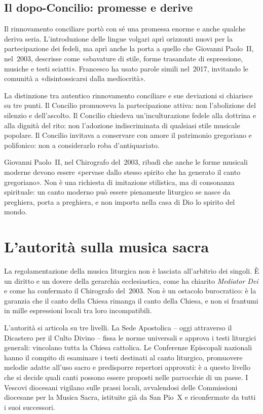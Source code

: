\documentclass[12pt,a4paper]{article}
\begin{document}
	\subsection{Il dopo-Concilio: promesse e derive}
	
	Il rinnovamento conciliare portò con sé una promessa enorme e anche qualche
	deriva seria. L'introduzione delle lingue volgari aprì orizzonti nuovi per la
	partecipazione dei fedeli, ma aprì anche la porta a quello che Giovanni
	Paolo~II, nel~2003, descrisse come «sbavature di stile, forme trasandate di
	espressione, musiche e testi sciatti». Francesco ha usato parole simili nel~2017,
	invitando le comunità a «disintossicarsi dalla mediocrità».
	
	La distinzione tra autentico rinnovamento conciliare e sue deviazioni si
	chiarisce su tre punti. Il Concilio promuoveva la partecipazione attiva: non
	l'abolizione del silenzio e dell'ascolto. Il Concilio chiedeva un'inculturazione
	fedele alla dottrina e alla dignità del rito: non l'adozione indiscriminata di
	qualsiasi stile musicale popolare. Il Concilio invitava a conservare con amore il
	patrimonio gregoriano e polifonico: non a considerarlo roba d'antiquariato.
	
	Giovanni Paolo~II, nel Chirografo del~2003, ribadì che anche le forme musicali
	moderne devono essere «pervase dallo stesso spirito che ha generato il canto
	gregoriano». Non è una richiesta di imitazione stilistica, ma di consonanza
	spirituale: un canto moderno può essere pienamente liturgico se nasce da
	preghiera, porta a preghiera, e non importa nella casa di Dio lo spirito del
	mondo.
	
	\section{L'autorità sulla musica sacra}
	
	La regolamentazione della musica liturgica non è lasciata all'arbitrio dei
	singoli. È un diritto e un dovere della gerarchia ecclesiastica, come ha
	chiarito \emph{Mediator Dei} e come ha confermato il Chirografo del~2003. Non è
	un ostacolo burocratico: è la garanzia che il canto della Chiesa rimanga il
	canto della Chiesa, e non si frantumi in mille espressioni locali tra loro
	incompatibili.
	
	L'autorità si articola su tre livelli. La Sede Apostolica -- oggi attraverso
	il Dicastero per il Culto Divino -- fissa le norme universali e approva i testi
	liturgici generali: vincolano tutta la Chiesa cattolica. Le Conferenze Episcopali
	nazionali hanno il compito di esaminare i testi destinati al canto liturgico,
	promuovere melodie adatte all'uso sacro e predisporre repertori approvati: è a
	questo livello che si decide quali canti possono essere proposti nelle parrocchie
	di un paese. I Vescovi diocesani vigilano sulle prassi locali, avvalendosi delle
	Commissioni diocesane per la Musica Sacra, istituite già da San Pio~X e
	riconfermate da tutti i suoi successori.
	
\end{document}
